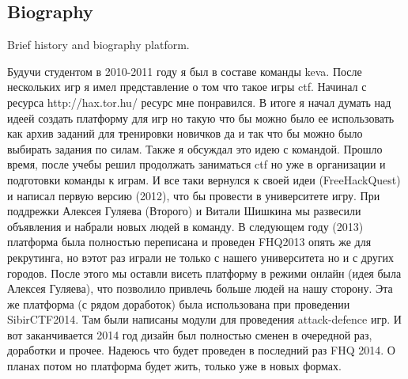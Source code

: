 
\subsection{Biography}

Brief history and biography platform.
\par
Будучи студентом в 2010-2011 году я был в составе команды keva.
После нескольких игр я имел представление о том что такое игры ctf.
Начинал с ресурса http://hax.tor.hu/ ресурс мне понравился.
В итоге я начал думать над идеей создать платформу для игр но такую что бы можно было
ее использовать как архив заданий для тренировки новичков да и так что бы можно было выбирать задания по силам.
Также я обсуждал это идею с командой. Прошло время, после учебы решил продолжать заниматься ctf но уже в организации и подготовки команды к играм.
И все таки вернулся к своей идеи (FreeHackQuest) и написал первую версию (2012), что бы провести в университете игру.
При поддрежки Алексея Гуляева (Второго) и Витали Шишкина мы развесили объявления и набрали новых людей в команду.
В следующем году (2013) платформа была полностью переписана и проведен FHQ2013 опять же для рекрутинга, но вэтот раз играли не только с нашего университета но и с других городов.
После этого мы оставли висеть платформу в режими онлайн (идея была Алексея Гуляева), что позволило привлечь больше людей на нашу сторону.
Эта же платформа (с рядом доработок) была использована при проведении SibirCTF2014. Там были написаны модули для проведения attack-defence игр.
И вот заканчивается 2014 год дизайн был полностью сменен в очередной раз, доработки и прочее. Надеюсь что будет проведен в последний раз FHQ 2014. 
О планах потом но платформа будет жить, только уже в новых формах.


